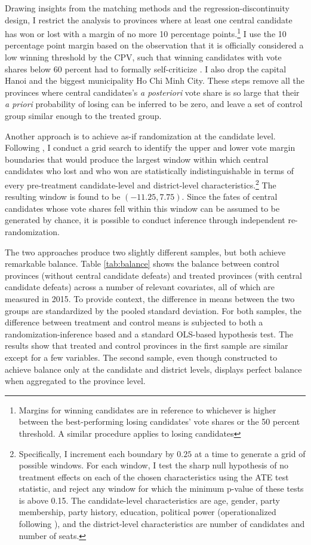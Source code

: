 \documentclass[12pt]{article}
\newcommand{\1}{\mathbbm{1}}
\begin{document}
Drawing insights from the matching methods and the regression-discontinuity design, I restrict the analysis to provinces where at least one central candidate has won or lost with a margin of no more 10 percentage points.\footnote{Margins for winning candidates are in reference to whichever is higher between the best-performing losing candidates' vote shares or the 50 percent threshold. A similar procedure applies to losing candidates} I use the 10 percentage point margin based on the observation that it is officially considered a low winning threshold by the CPV, such that winning candidates with vote shares below 60 percent had to formally self-criticize \citep{MaleskySchuler2011}. I also drop the capital Hanoi and the biggest municipality Ho Chi Minh City. These steps remove all the provinces where central candidates's \textit{a posteriori} vote share is so large that their \textit{a priori} probability of losing can be inferred to be zero, and leave a set of control group similar enough to the treated group.

Another approach is to achieve as-if randomization at the candidate level. Following \citet{CattaneoTitiunik2015}, I conduct a grid search to identify the upper and lower vote margin boundaries that would produce the largest window within which central candidates who lost and who won are statistically indistinguishable in terms of every pre-treatment candidate-level and district-level characteristics.\footnote{Specifically, I  increment each boundary by $0.25$ at a time to generate a grid of possible windows. For each window, I test the sharp null hypothesis of no treatment effects on each of the chosen characteristics using the ATE test statistic, and reject any window for which the minimum p-value of these tests is above 0.15. The candidate-level characteristics are age, gender, party membership, party history, education, political power (operationalized following \citet{MaleskySchuler2011}), and the district-level characteristics are number of candidates and number of seats.} The resulting window is found to be $(-11.25, 7.75)$. Since the fates of central candidates whose vote shares fell within this window can be assumed to be generated by chance, it is possible to conduct inference through independent re-randomization. 

The two approaches produce two slightly different samples, but both achieve remarkable balance. Table \ref{tab:balance} shows the balance between control provinces (without central candidate defeats) and treated provinces (with central candidate defeats) across a number of relevant covariates, all of which are measured in 2015. To provide context, the difference in means between the two groups are standardized by the pooled standard deviation. For both samples, the difference between treatment and control means is subjected to both a randomization-inference based and a standard OLS-based hypothesis test. The results show that treated and control provinces in the first sample are similar except for a few variables. The second sample, even though constructed to achieve balance only at the candidate and district levels, displays perfect balance when aggregated to the province level. 
\end{document}
